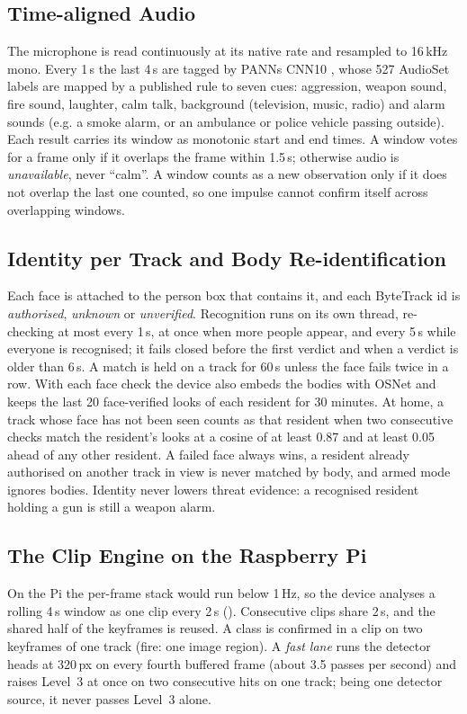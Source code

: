 \subsection{Time-aligned Audio}
The microphone is read continuously at its native rate and resampled to 16\,kHz mono. Every 1\,s the last 4\,s are tagged by PANNs CNN10 \cite{kong2020panns}, whose 527 AudioSet labels are mapped by a published rule to seven cues: aggression, weapon sound, fire sound, laughter, calm talk, background (television, music, radio) and alarm sounds (e.g. a smoke alarm, or an ambulance or police vehicle passing outside). Each result carries its window as monotonic start and end times. A window votes for a frame only if it overlaps the frame within 1.5\,s; otherwise audio is \emph{unavailable}, never ``calm''. A window counts as a new observation only if it does not overlap the last one counted, so one impulse cannot confirm itself across overlapping windows.

\subsection{Identity per Track and Body Re-identification}
Each face is attached to the person box that contains it, and each ByteTrack id is \emph{authorised}, \emph{unknown} or \emph{unverified}. Recognition runs on its own thread, re-checking at most every 1\,s, at once when more people appear, and every 5\,s while everyone is recognised; it fails closed before the first verdict and when a verdict is older than 6\,s. A match is held on a track for 60\,s unless the face fails twice in a row. With each face check the device also embeds the bodies with OSNet \cite{zhou2019osnet} and keeps the last 20 face-verified looks of each resident for 30 minutes. At home, a track whose face has not been seen counts as that resident when two consecutive checks match the resident's looks at a cosine of at least 0.87 and at least 0.05 ahead of any other resident. A failed face always wins, a resident already authorised on another track in view is never matched by body, and armed mode ignores bodies. Identity never lowers threat evidence: a recognised resident holding a gun is still a weapon alarm.

\subsection{The Clip Engine on the Raspberry Pi}
\label{sec:clip}
On the Pi the per-frame stack would run below 1\,Hz, so the device analyses a rolling 4\,s window as one clip every 2\,s (). Consecutive clips share 2\,s, and the shared half of the keyframes is reused. A class is confirmed in a clip on two keyframes of one track (fire: one image region). A \emph{fast lane} runs the detector heads at 320\,px on every fourth buffered frame (about 3.5 passes per second) and raises Level~3 at once on two consecutive hits on one track; being one detector source, it never passes Level~3 alone.

